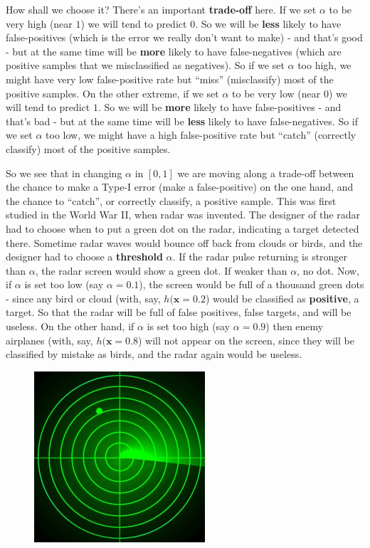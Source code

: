 \documentclass[11pt]{article}
\newcommand{\VV}[1]{\mathbf{#1}}
\begin{document}
      How shall we choose it? There's an important {\bf trade-off} here. 
      If we set $\alpha$ to be very high (near $1$) we will tend to predict $0$. So we will be {\bf
      less}
      likely to have false-positives (which is the error we really don't want to
      make) - and that's good - but at the same time will be {\bf more} likely
      to have false-negatives (which are positive samples that we misclassified
      as negatives). So if we set $\alpha$ too high, we might have very low
      false-positive rate but ``miss'' (misclassify) most of the positive samples. 
      On the other extreme, if we set $\alpha$ to be very low (near $0$) we
      will tend to predict $1$. So we will be {\bf more} likely to have
      false-positives - and that's bad - but at the same time will be {\bf less}
    likely to have false-negatives. So if we set $\alpha$ too low, we might
    have a high false-positive rate but ``catch'' (correctly classify) most of
    the positive samples. 

    So we see that in changing $\alpha$ in $[0,1]$ we are moving along a
    trade-off between the chance to make a Type-I error (make a false-positive)
    on the one hand, and the chance to ``catch'', or correctly classify, a
    positive sample. This was first studied in the World War II, when radar was
    invented. The designer of the radar had to choose when to put a green dot on
    the radar, indicating a target detected there. Sometime radar waves would
    bounce off back from clouds or birds, and the designer had to choose a {\bf
    threshold} $\alpha$. If the radar pulse returning is stronger than
    $\alpha$, the radar screen would show a green dot. If weaker than $\alpha$,
    no dot. Now, if $\alpha$ is set too low (say $\alpha=0.1$), the screen would be full of a
    thousand green dots - since any bird or cloud (with, say, $h(\VV{x}=0.2$) would be classified as {\bf
      positive}, a target. So that the radar will be full of false positives,
      false targets, and will be useless. On the other hand, if $\alpha$ is set
      too high (say $\alpha=0.9$) then enemy airplanes  (with, say,
	$h(\VV{x}=0.8$) will not appear on the screen, since they will be
	classified by mistake as birds, and the radar again would
	be useless. 

	\begin{figure}[h!]
	  \centering
	  \includegraphics[width=2.5in]{radar.jpg}
	\end{figure}
\end{document}

